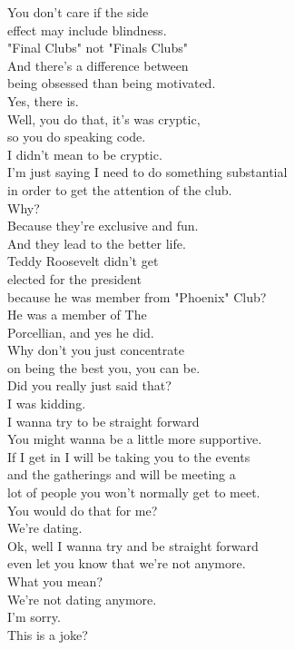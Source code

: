 \documentclass{article}
\begin{document}
\begin{multicols}{3}
You don't care if the side\\
effect may include blindness.\\
"Final Clubs" not "Finals Clubs"\\
And there's a difference between\\
being obsessed than being motivated.\\
Yes, there is.\\
Well, you do that, it's was cryptic,\\
so you do speaking code.\\
I didn't mean to be cryptic.\\
I'm just saying I need to do something substantial\\
in order to get the attention of the club.\\
Why?\\
Because they're exclusive and fun.\\
And they lead to the better life.\\
Teddy Roosevelt didn't get\\
elected for the president\\
because he was member from "Phoenix" Club?\\
He was a member of The\\
Porcellian, and yes he did.\\
Why don't you just concentrate\\
on being the best you, you can be.\\
Did you really just said that?\\
I was kidding.\\
I wanna try to be straight forward\\
You might wanna be a little more supportive.\\
If I get in I will be taking you to the events\\
and the gatherings and will be meeting a\\
lot of people you won't normally get to meet.\\
You would do that for me?\\
We're dating.\\
Ok, well I wanna try and be straight forward\\
even let you know that we're not anymore.\\
What you mean?\\
We're not dating anymore.\\
I'm sorry.\\
This is a joke?\\

\end{multicols}
\end{document}
